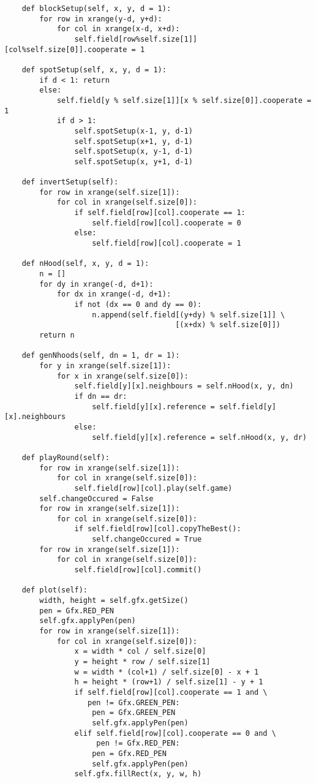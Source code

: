\documentclass[12pt,a4paper,ngerman]{article}
\begin{document}
\begin{scriptsize}
\begin{verbatim}
    def blockSetup(self, x, y, d = 1):
        for row in xrange(y-d, y+d):
            for col in xrange(x-d, x+d):
                self.field[row%self.size[1]][col%self.size[0]].cooperate = 1

    def spotSetup(self, x, y, d = 1):
        if d < 1: return
        else:
            self.field[y % self.size[1]][x % self.size[0]].cooperate = 1
            if d > 1:
                self.spotSetup(x-1, y, d-1)
                self.spotSetup(x+1, y, d-1)
                self.spotSetup(x, y-1, d-1)
                self.spotSetup(x, y+1, d-1)

    def invertSetup(self):
        for row in xrange(self.size[1]):
            for col in xrange(self.size[0]):
                if self.field[row][col].cooperate == 1:
                    self.field[row][col].cooperate = 0
                else:
                    self.field[row][col].cooperate = 1

    def nHood(self, x, y, d = 1):
        n = []
        for dy in xrange(-d, d+1):
            for dx in xrange(-d, d+1):
                if not (dx == 0 and dy == 0):
                    n.append(self.field[(y+dy) % self.size[1]] \
                                       [(x+dx) % self.size[0]])
        return n
        
    def genNhoods(self, dn = 1, dr = 1):
        for y in xrange(self.size[1]):
            for x in xrange(self.size[0]):
                self.field[y][x].neighbours = self.nHood(x, y, dn)
                if dn == dr:
                    self.field[y][x].reference = self.field[y][x].neighbours
                else:
                    self.field[y][x].reference = self.nHood(x, y, dr)
              
    def playRound(self):
        for row in xrange(self.size[1]):
            for col in xrange(self.size[0]):
                self.field[row][col].play(self.game)
        self.changeOccured = False
        for row in xrange(self.size[1]):
            for col in xrange(self.size[0]):
                if self.field[row][col].copyTheBest():
                    self.changeOccured = True
        for row in xrange(self.size[1]):
            for col in xrange(self.size[0]):
                self.field[row][col].commit()

    def plot(self):
        width, height = self.gfx.getSize()
        pen = Gfx.RED_PEN
        self.gfx.applyPen(pen)
        for row in xrange(self.size[1]):
            for col in xrange(self.size[0]):
                x = width * col / self.size[0]
                y = height * row / self.size[1]
                w = width * (col+1) / self.size[0] - x + 1
                h = height * (row+1) / self.size[1] - y + 1
                if self.field[row][col].cooperate == 1 and \
                   pen != Gfx.GREEN_PEN:
                    pen = Gfx.GREEN_PEN
                    self.gfx.applyPen(pen)
                elif self.field[row][col].cooperate == 0 and \
                     pen != Gfx.RED_PEN:
                    pen = Gfx.RED_PEN
                    self.gfx.applyPen(pen)
                self.gfx.fillRect(x, y, w, h)


\end{verbatim}
\end{scriptsize}
\end{document}

